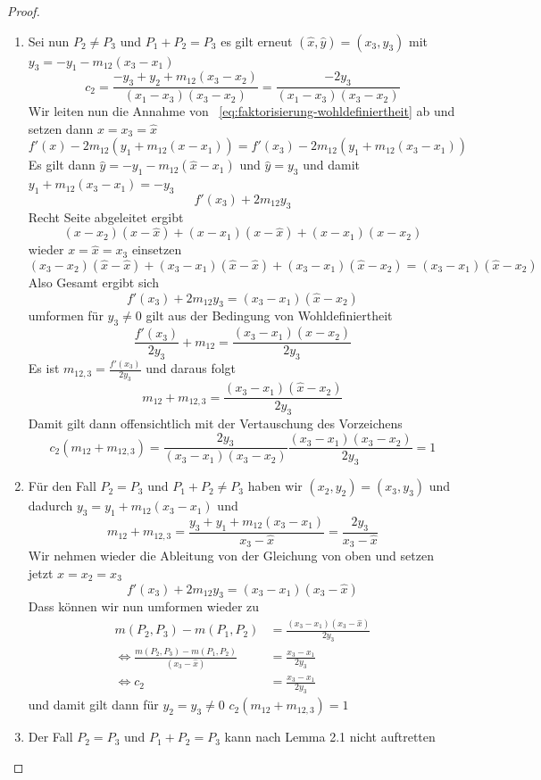 \begin{proof}
\begin{enumerate}
        \item Sei nun $P_2\neq P_3$ und $P_1+P_2=P_3$ es gilt erneut $(\hat{x},\hat{y})=(x_3,y_3)$ mit $y_3=-y_1-m_{12}(x_3-x_1)$
              \[
                  c_2 = \frac{-y_3+y_2+m_{12}(x_3-x_2)}{(x_1-x_3)(x_3-x_2)} = \frac{-2y_3}{(x_1-x_3)(x_3-x_2)}
              \]
              Wir leiten nun die Annahme von ~\eqref{eq:faktorisierung-wohldefiniertheit} ab und setzen dann $x=x_3=\hat{x}$
              \[
                  f'(x)-2m_{12}(y_1+m_{12}(x-x_1))=f'(x_3)-2m_{12}(y_1+m_{12}(x_3-x_1))
              \]
              Es gilt dann $\hat{y}=-y_1-m_{12}(\hat{x}-x_1)$ und $\hat{y}=y_3$ und damit $y_1+m_{12}(x_3-x_1)=-y_3$
              \[
                  f'(x_3)+2m_{12}y_3
              \]
              Recht Seite abgeleitet ergibt
              \[
                  (x-x_2)(x-\hat{x})+(x-x_1)(x-\hat{x})+(x-x_1)(x-x_2)
              \]
              wieder $x=\hat{x}=x_3$ einsetzen
              \[
                  (x_3-x_2)(\hat{x}-\hat{x})+(x_3-x_1)(\hat{x}-\hat{x})+(x_3-x_1)(\hat{x}-x_2)
                  = (x_3-x_1)(\hat{x}-x_2)
              \]
              Also Gesamt ergibt sich
              \[
                  f'(x_3)+2m_{12}y_3 = (x_3-x_1)(\hat{x}-x_2)
              \]
              umformen für $y_3\neq 0$ gilt aus der Bedingung von Wohldefiniertheit
              \[
                  \frac{f'(x_3)}{2y_3}+m_{12} = \frac{(x_3-x_1)(\hat{x}-x_2)}{2y_3}
              \]
              Es ist $m_{12,3}=\frac{f'(x_3)}{2y_3}$ und daraus folgt
              \[
                  m_{12}+m_{12,3}= \frac{(x_3-x_1)(\hat{x}-x_2)}{2y_3}
              \]
              Damit gilt dann offensichtlich mit der Vertauschung des Vorzeichens
              \[
                  c_2(m_{12}+m_{12,3})= \frac{2y_3}{(x_3-x_1)(x_3-x_2)}\frac{(x_3-x_1)(x_3-x_2)}{2y_3}= 1
              \]
        \item Für den Fall $P_2=P_3$ und $P_1+P_2\neq P_3$ haben wir $(x_2,y_2)=(x_3,y_3)$ und dadurch $y_3=y_1+m_{12}(x_3-x_1)$ und
              \[
                  m_{12}+m_{12,3}=\frac{y_3+y_1+m_{12}(x_3-x_1)}{x_3-\hat{x}}= \frac{2y_3}{x_3-\hat{x}}
              \]
              Wir nehmen wieder die Ableitung von der Gleichung von oben und setzen jetzt $x=x_2=x_3$
              \[
                  f'(x_3)+2m_{12}y_3 = (x_3-x_1)(x_3-\hat{x})
              \]
              Dass können wir nun umformen wieder zu
              \begin{align*}
                    m(P_2,P_3)-m(P_1,P_2)&=\frac{(x_3-x_1)(x_3-\hat{x})}{2y_3}      \\
                   \Leftrightarrow 
                  \frac{m(P_2,P_3)-m(P_1,P_2)}{(x_3-\hat{x})}&= \frac{x_3-x_1}{2y_3} \\ \Leftrightarrow 
                  c_2 &= \frac{x_3-x_1}{2y_3}
              \end{align*}
              und damit gilt dann für $y_2=y_3\neq 0$ \(c_2(m_{12}+m_{12,3})=1\)
        \item Der Fall $P_2=P_3$ und $P_1+P_2=P_3$ kann nach Lemma 2.1 nicht auftretten
    \end{enumerate}
\end{proof}

